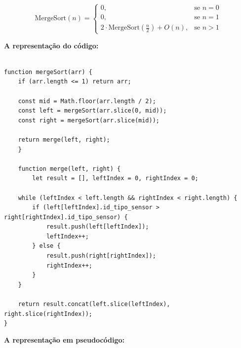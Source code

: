 \documentclass[
  a4paper,
  12pt,
  english,
  brazilian,
]{article}
\begin{document}
\[
\text{MergeSort}(n) =
\begin{cases}
0, & \text{se } n = 0 \\
0, & \text{se } n = 1 \\
2 \cdot \text{MergeSort}\left(\frac{n}{2}\right) + O(n), & \text{se } n > 1
\end{cases}
\]

\textbf {A representação do código:} 

\begin{verbatim}
    
function mergeSort(arr) {
    if (arr.length <= 1) return arr;

    const mid = Math.floor(arr.length / 2);
    const left = mergeSort(arr.slice(0, mid));
    const right = mergeSort(arr.slice(mid));

    return merge(left, right);
    }

    function merge(left, right) {
        let result = [], leftIndex = 0, rightIndex = 0;

    while (leftIndex < left.length && rightIndex < right.length) {
        if (left[leftIndex].id_tipo_sensor > right[rightIndex].id_tipo_sensor) {
            result.push(left[leftIndex]);
            leftIndex++;
        } else {
            result.push(right[rightIndex]);
            rightIndex++;
        }
    }

    return result.concat(left.slice(leftIndex), right.slice(rightIndex));
}

\end{verbatim}

\textbf {A representação em pseudocódigo:} 
\end{document}
